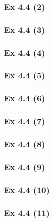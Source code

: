\subsubsection{Ex 4.4 (2)}\label{sec:Ex_4.4.2}

\subsubsection{Ex 4.4 (3)}\label{sec:Ex_4.4.3}

\subsubsection{Ex 4.4 (4)}\label{sec:Ex_4.4.4}

\subsubsection{Ex 4.4 (5)}\label{sec:Ex_4.4.5}

\subsubsection{Ex 4.4 (6)}\label{sec:Ex_4.4.6}

\subsubsection{Ex 4.4 (7)}\label{sec:Ex_4.4.7}

\subsubsection{Ex 4.4 (8)}\label{sec:Ex_4.4.8}

\subsubsection{Ex 4.4 (9)}\label{sec:Ex_4.4.9}

\subsubsection{Ex 4.4 (10)}\label{sec:Ex_4.4.10}

\newpage		%

\subsubsection{Ex 4.4 (11)}\label{sec:Ex_4.4.11}

